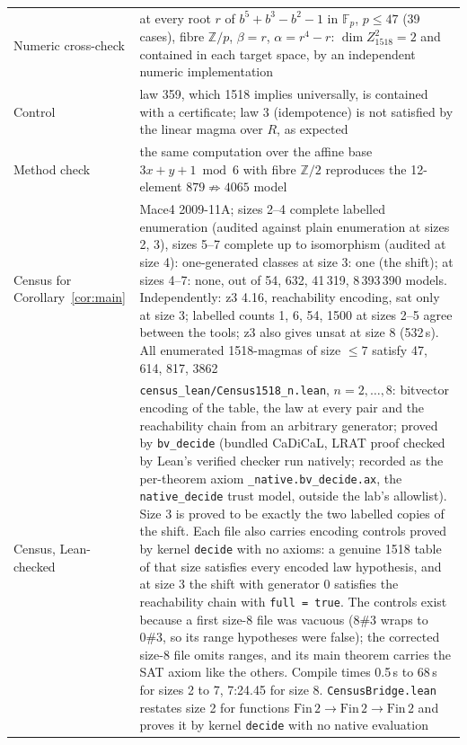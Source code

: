 \documentclass[11pt]{article}
\theoremstyle{remark}\newtheorem*{remark}{Remark}
\newcommand{\Z}{\mathbb{Z}}
\newcommand{\F}{\mathbb{F}}
\begin{document}
\begin{longtable}{p{} p{}}
Numeric cross-check & at every root $r$ of $b^{5}+b^{3}-b^{2}-1$ in $\F_p$, $p\le 47$ (39 cases), fibre $\Z/p$, $\beta=r$, $\alpha=r^{4}-r$: $\dim Z^{2}_{1518}=2$ and contained in each target space, by an independent numeric implementation \\
Control & law 359, which 1518 implies universally, is contained with a certificate; law 3 (idempotence) is not satisfied by the linear magma over $R$, as expected \\
Method check & the same computation over the affine base $3x+y+1 \bmod 6$ with fibre $\Z/2$ reproduces the 12-element $879\not\Rightarrow4065$ model \\
Census for Corollary~\ref{cor:main} & Mace4 2009-11A; sizes 2--4 complete labelled enumeration (audited against plain enumeration at sizes 2, 3), sizes 5--7 complete up to isomorphism (audited at size 4): one-generated classes at size 3: one (the shift); at sizes 4--7: none, out of 54, 632, 41\,319, 8\,393\,390 models. Independently: z3 4.16, reachability encoding, sat only at size 3; labelled counts 1, 6, 54, 1500 at sizes 2--5 agree between the tools; z3 also gives unsat at size 8 (532\,s). All enumerated 1518-magmas of size $\le 7$ satisfy 47, 614, 817, 3862 \\
Census, Lean-checked & \texttt{census\_lean/Census1518\_n.lean}, $n=2,\dots,8$: bitvector encoding of the table, the law at every pair and the reachability chain from an arbitrary generator; proved by \texttt{bv\_decide} (bundled CaDiCaL, LRAT proof checked by Lean's verified checker run natively; recorded as the per-theorem axiom \texttt{\_native.bv\_decide.ax}, the \texttt{native\_decide} trust model, outside the lab's allowlist). Size 3 is proved to be exactly the two labelled copies of the shift. Each file also carries encoding controls proved by kernel \texttt{decide} with no axioms: a genuine 1518 table of that size satisfies every encoded law hypothesis, and at size 3 the shift with generator 0 satisfies the reachability chain with \texttt{full = true}. The controls exist because a first size-8 file was vacuous ($8\#3$ wraps to $0\#3$, so its range hypotheses were false); the corrected size-8 file omits ranges, and its main theorem carries the SAT axiom like the others. Compile times 0.5\,s to 68\,s for sizes 2 to 7, 7:24.45 for size 8. \texttt{CensusBridge.lean} restates size 2 for functions $\mathrm{Fin}\,2\to\mathrm{Fin}\,2\to\mathrm{Fin}\,2$ and proves it by kernel \texttt{decide} with no native evaluation \\
\bottomrule
\end{longtable}
\endgroup
\end{document}
